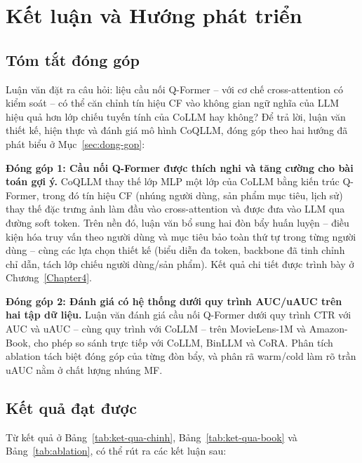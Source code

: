 \chapter{Kết luận và Hướng phát triển}
\label{Chapter5}

\section{Tóm tắt đóng góp}
\label{sec:tom-tat-dong-gop}

Luận văn đặt ra câu hỏi: liệu cầu nối Q-Former -- với cơ chế cross-attention có kiểm
soát -- có thể căn chỉnh tín hiệu CF vào không gian ngữ nghĩa của LLM hiệu quả
hơn lớp chiếu tuyến tính của CoLLM hay không? Để trả lời, luận văn thiết kế, hiện thực và đánh
giá mô hình CoQLLM, đóng góp theo hai hướng đã phát biểu ở Mục~\ref{sec:dong-gop}:

\textbf{Đóng góp 1: Cầu nối Q-Former được thích nghi và tăng cường cho bài toán gợi ý.}
CoQLLM thay thế lớp MLP một lớp của CoLLM bằng kiến trúc Q-Former, trong đó tín hiệu CF
(nhúng người dùng, sản phẩm mục tiêu, lịch sử) thay thế đặc trưng ảnh làm đầu vào
cross-attention và được đưa vào LLM qua đường soft token. Trên nền đó, luận văn bổ sung hai
đòn bẩy huấn luyện -- điều kiện hóa truy vấn theo người dùng và mục tiêu bảo toàn thứ tự
trong từng người dùng -- cùng các lựa chọn thiết kế (biểu diễn đa token, backbone đã tinh chỉnh chỉ
dẫn, tách lớp chiếu người dùng/sản phẩm). Kết quả chi tiết được trình bày ở
Chương~\ref{Chapter4}.

\textbf{Đóng góp 2: Đánh giá có hệ thống dưới quy trình AUC/uAUC trên hai tập dữ liệu.}
Luận văn đánh giá cầu nối Q-Former dưới quy trình CTR với AUC và uAUC -- cùng quy trình với
CoLLM -- trên MovieLens-1M và Amazon-Book, cho phép so sánh trực tiếp với CoLLM, BinLLM và
CoRA. Phân tích ablation tách biệt đóng góp của từng đòn bẩy, và phân rã warm/cold làm rõ
trần uAUC nằm ở chất lượng nhúng MF.

\section{Kết quả đạt được}
\label{sec:ket-qua-dat-duoc}

Từ kết quả ở Bảng~\ref{tab:ket-qua-chinh}, Bảng~\ref{tab:ket-qua-book} và
Bảng~\ref{tab:ablation}, có thể rút ra các kết luận sau:

